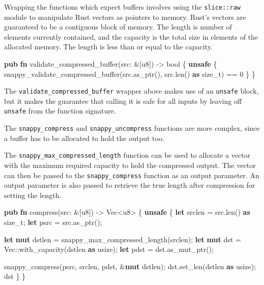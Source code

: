 \documentclass[a4paper,]{book}
\newenvironment{Shaded}{\begin{snugshade}}{\end{snugshade}}
\newcommand{\KeywordTok}[1]{\textcolor[rgb]{0.13,0.29,0.53}{\textbf{{#1}}}}
\newcommand{\DataTypeTok}[1]{\textcolor[rgb]{0.13,0.29,0.53}{{#1}}}
\newcommand{\DecValTok}[1]{\textcolor[rgb]{0.00,0.00,0.81}{{#1}}}
\newcommand{\NormalTok}[1]{{#1}}
\begin{document}
Wrapping the functions which expect buffers involves using the
\texttt{slice::raw} module to manipulate Rust vectors as pointers to
memory. Rust's vectors are guaranteed to be a contiguous block of
memory. The length is number of elements currently contained, and the
capacity is the total size in elements of the allocated memory. The
length is less than or equal to the capacity.

\begin{Shaded}
\begin{Highlighting}[]
\KeywordTok{pub} \KeywordTok{fn} \NormalTok{validate_compressed_buffer(src: &[}\DataTypeTok{u8}\NormalTok{]) -> }\DataTypeTok{bool} \NormalTok{\{}
    \KeywordTok{unsafe} \NormalTok{\{}
        \NormalTok{snappy_validate_compressed_buffer(src.as_ptr(), src.len() }\KeywordTok{as} \DataTypeTok{size_t}\NormalTok{) == }\DecValTok{0}
    \NormalTok{\}}
\NormalTok{\}}
\end{Highlighting}
\end{Shaded}

The \texttt{validate\_compressed\_buffer} wrapper above makes use of an
\texttt{unsafe} block, but it makes the guarantee that calling it is
safe for all inputs by leaving off \texttt{unsafe} from the function
signature.

The \texttt{snappy\_compress} and \texttt{snappy\_uncompress} functions
are more complex, since a buffer has to be allocated to hold the output
too.

The \texttt{snappy\_max\_compressed\_length} function can be used to
allocate a vector with the maximum required capacity to hold the
compressed output. The vector can then be passed to the
\texttt{snappy\_compress} function as an output parameter. An output
parameter is also passed to retrieve the true length after compression
for setting the length.

\begin{Shaded}
\begin{Highlighting}[]
\KeywordTok{pub} \KeywordTok{fn} \NormalTok{compress(src: &[}\DataTypeTok{u8}\NormalTok{]) -> }\DataTypeTok{Vec}\NormalTok{<}\DataTypeTok{u8}\NormalTok{> \{}
    \KeywordTok{unsafe} \NormalTok{\{}
        \KeywordTok{let} \NormalTok{srclen = src.len() }\KeywordTok{as} \DataTypeTok{size_t}\NormalTok{;}
        \KeywordTok{let} \NormalTok{psrc = src.as_ptr();}

        \KeywordTok{let} \KeywordTok{mut} \NormalTok{dstlen = snappy_max_compressed_length(srclen);}
        \KeywordTok{let} \KeywordTok{mut} \NormalTok{dst = }\DataTypeTok{Vec}\NormalTok{::with_capacity(dstlen }\KeywordTok{as} \DataTypeTok{usize}\NormalTok{);}
        \KeywordTok{let} \NormalTok{pdst = dst.as_mut_ptr();}

        \NormalTok{snappy_compress(psrc, srclen, pdst, &}\KeywordTok{mut} \NormalTok{dstlen);}
        \NormalTok{dst.set_len(dstlen }\KeywordTok{as} \DataTypeTok{usize}\NormalTok{);}
        \NormalTok{dst}
    \NormalTok{\}}
\NormalTok{\}}
\end{Highlighting}
\end{Shaded}
\end{document}
